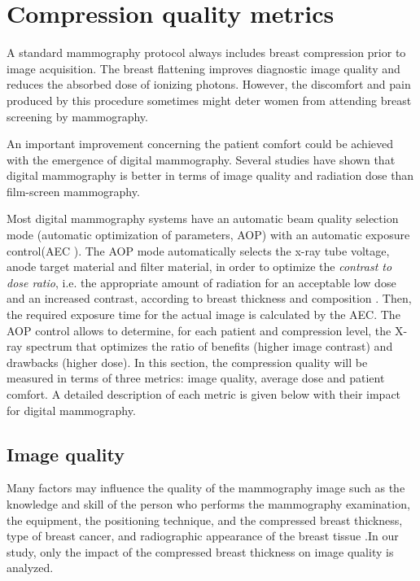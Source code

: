 \section{Compression quality metrics}
A standard mammography protocol always includes breast compression prior to image acquisition. The breast flattening improves diagnostic image quality and reduces the absorbed dose of ionizing photons. However, the discomfort and pain produced by this procedure sometimes might deter women from attending breast screening by mammography. 

An important improvement concerning the patient comfort could be achieved with the emergence of digital mammography.  Several studies have shown that digital mammography is better in terms of image quality \citep{obenauer_screen_2002} and radiation dose \citep{chen_analysis_2012} than film-screen mammography.

Most digital mammography systems have an automatic beam quality selection mode (automatic optimization of parameters, AOP) with an automatic exposure control(AEC ). The AOP mode automatically selects the x-ray  tube  voltage,  anode  target  material  and  filter  material, in order to optimize the \textit{contrast to dose ratio}, i.e. the appropriate amount of radiation for an acceptable low dose and an increased contrast, according to breast thickness and composition \citep{williams_optimization_2008}. Then, the required exposure time for the actual image is calculated by the AEC.  The AOP control allows to determine, for each patient and compression level, the X-ray spectrum that optimizes the  ratio of benefits  (higher image contrast) and  drawbacks  (higher  dose). 
In this section, the compression quality will be measured in terms of three metrics: image quality, average dose and patient comfort. A detailed description of each metric is given below with their impact for digital mammography. 

\subsection{Image quality}

Many factors may influence the quality of the mammography image such as the knowledge and skill of the person who performs the mammography examination, the equipment, the positioning
technique, and the compressed breast thickness, type of breast
cancer, and radiographic appearance of the breast tissue \citep{de_pain_2015,andolina2011mammographic}.In our study, only the impact of the compressed breast thickness on image quality is analyzed.

